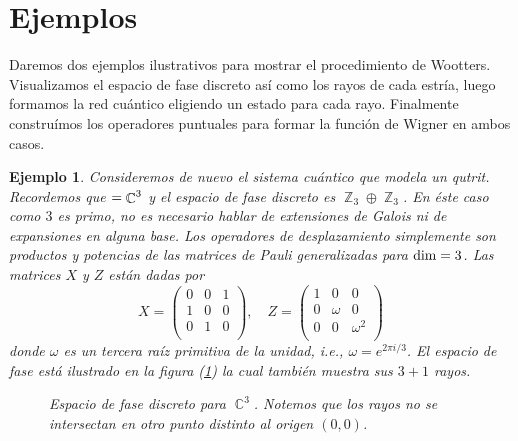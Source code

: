 \documentclass[a4paper]{report}
\DeclareMathOperator{\C}{\mathbb{C}}
\DeclareMathOperator{\Z}{\mathbb{Z}}
\let\H\relax
\DeclareMathOperator{\H}{\mathcal H}
\newtheorem{example}{Ejemplo}
\begin{document}
  \section{Ejemplos}

  Daremos dos ejemplos ilustrativos para mostrar el
  procedimiento de Wootters. Visualizamos el espacio de fase
  discreto así como los rayos de cada estría, luego formamos
  la red cuántico eligiendo un estado para cada rayo.
  Finalmente construímos los operadores puntuales para
  formar la función de Wigner en ambos casos.

  \begin{example}
    Consideremos de nuevo el sistema cuántico que modela un
    qutrit. Recordemos que $\H = \C^{3}$ y el espacio de
    fase discreto es $\Z_3 \oplus \Z_3$. En éste caso como
    $3$ es primo, no es necesario hablar de extensiones de
    Galois ni de expansiones en alguna base. Los operadores
    de desplazamiento simplemente son productos y potencias
    de las matrices de Pauli generalizadas para $\dim \H =
    3$. Las matrices $X$ y $Z$ están dadas por
    \begin{equation}
      X = \begin{pmatrix} 
        0 & 0 & 1 \\
        1 & 0 & 0 \\
        0 & 1 & 0 \\
      \end{pmatrix},
      \quad
      Z = \begin{pmatrix} 
        1 & 0 & 0 \\
        0 & \omega & 0 \\
        0 & 0 & \omega^2 \\
      \end{pmatrix} 
    \end{equation}
    donde $\omega$ es un tercera raíz primitiva de la
    unidad, i.e., $\omega = e^{2\pi i / 3}$. El espacio de
    fase está ilustrado en la figura
    (\ref{fig:qutrit-phase-space}) la cual también muestra
    sus $3 + 1$ rayos. 
    \begin{figure}[ht]
      \centering
      \scalebox{0.6}{
        
      }
      \caption{Espacio de fase discreto para $\C^3$. Notemos
      que los rayos no se intersectan en otro punto distinto
      al origen $(0,0)$.}
      \label{fig:qutrit-phase-space}
    \end{figure}


\end{example}
\end{document}
